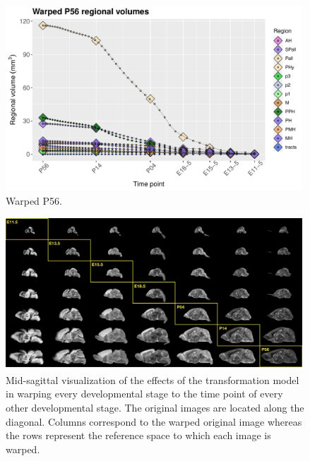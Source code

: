 \documentclass[
  12pt,
]{article}
\begin{document}
\begin{figure}[!htb]
\centering
\includegraphics[width=0.99\textwidth]{Figures/warpedP56Volumes.pdf}
\caption{Warped P56.}
\label{fig:warpedP56}
\end{figure}

\begin{figure}[!htb]
\centering
\includegraphics[width=0.99\textwidth]{Figures/CrossWarp.pdf}
\caption{Mid-sagittal visualization of the effects of the transformation model in
warping every developmental stage to the time point of every other developmental
stage.  The original images are located along the diagonal.  Columns correspond
to the warped original image whereas the rows represent the reference space to which
each image is warped.}
\label{fig:crosswarp}
\end{figure}
\end{document}
